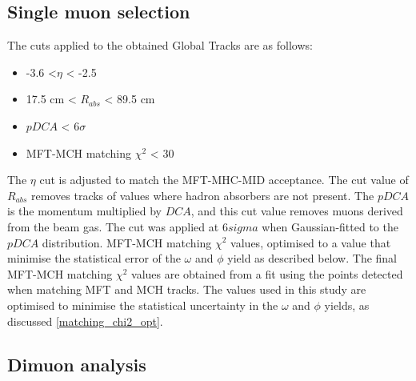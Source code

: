     \subsection{Single muon selection}
    \label{Single_muon_selection}
        The cuts applied to the obtained Global Tracks are as follows:
        \begin{itemize}{}
            \item -3.6 <$\eta$ < -2.5
            \item 17.5 cm < $R_{abs}$ < 89.5 cm
            \item $pDCA$ < 6$\sigma$
            \item MFT-MCH matching $\chi^2$ < 30
        \end{itemize}
        The $\eta$ cut is adjusted to match the MFT-MHC-MID acceptance. 
        The cut value of $R_{abs}$ removes tracks of values where hadron absorbers are not present.
        The $pDCA$ is the momentum multiplied by $DCA$, and this cut value removes muons derived from the beam gas. The cut was applied at 6$sigma$ when Gaussian-fitted to the $pDCA$ distribution.
        MFT-MCH matching $\chi^2$ values, optimised to a value that minimise the statistical error of the $\omega$ and $\phi$ yield as described below.
        The final MFT-MCH matching $\chi^2$ values are obtained from a fit using the points detected when matching MFT and MCH tracks. The values used in this study are optimised to minimise the statistical uncertainty in the $\omega$ and $\phi$ yields, as discussed \ref{matching_chi2_opt}.
    
        \subsection{Dimuon analysis}
        \label{Dimuon}
